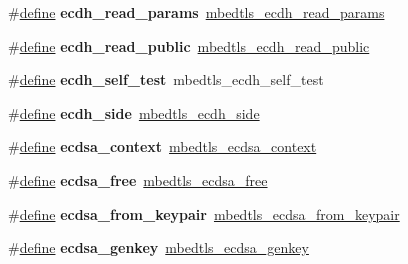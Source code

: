 \begin{DoxyCompactItemize}
\item 
\mbox{\label{compat-1_83_8h_a1052d06393481c61c19e62e19f0b2260}} 
\#\hyperlink{structdefine}{define} {\bfseries ecdh\+\_\+read\+\_\+params}~\hyperlink{ecdh_8h_af07326ad0017bf6fcfb9f93e43641254}{mbedtls\+\_\+ecdh\+\_\+read\+\_\+params}
\item 
\mbox{\label{compat-1_83_8h_a2f7e60281e99eb5f0377614c1acb1b1d}} 
\#\hyperlink{structdefine}{define} {\bfseries ecdh\+\_\+read\+\_\+public}~\hyperlink{ecdh_8h_a9f417d90797b109d3036feb288e33207}{mbedtls\+\_\+ecdh\+\_\+read\+\_\+public}
\item 
\mbox{\label{compat-1_83_8h_a1fd1aa9b4c0bc9cbf99bef8484624144}} 
\#\hyperlink{structdefine}{define} {\bfseries ecdh\+\_\+self\+\_\+test}~mbedtls\+\_\+ecdh\+\_\+self\+\_\+test
\item 
\mbox{\label{compat-1_83_8h_a86adb79cf567e9e5d6ad27336e598a31}} 
\#\hyperlink{structdefine}{define} {\bfseries ecdh\+\_\+side}~\hyperlink{ecdh_8h_ae5df12f2068df09a102e05e02fb1e39c}{mbedtls\+\_\+ecdh\+\_\+side}
\item 
\mbox{\label{compat-1_83_8h_a4e8a6b236724a3639613342f873da048}} 
\#\hyperlink{structdefine}{define} {\bfseries ecdsa\+\_\+context}~\hyperlink{ecdsa_8h_a86ad4c743272c83310c20585ec7a182f}{mbedtls\+\_\+ecdsa\+\_\+context}
\item 
\mbox{\label{compat-1_83_8h_a063d0a32d1dde6268c44d36c92819b36}} 
\#\hyperlink{structdefine}{define} {\bfseries ecdsa\+\_\+free}~\hyperlink{ecdsa_8h_a28dd93cb376a51cce39f062858c1c186}{mbedtls\+\_\+ecdsa\+\_\+free}
\item 
\mbox{\label{compat-1_83_8h_a0f0e05776d34f3190858eaf30cd06792}} 
\#\hyperlink{structdefine}{define} {\bfseries ecdsa\+\_\+from\+\_\+keypair}~\hyperlink{ecdsa_8h_a6de8efd872cfe1bc2ee93b4a5584226c}{mbedtls\+\_\+ecdsa\+\_\+from\+\_\+keypair}
\item 
\mbox{\label{compat-1_83_8h_ac5b5a9c03ad7266d7054cdf8e67da9c9}} 
\#\hyperlink{structdefine}{define} {\bfseries ecdsa\+\_\+genkey}~\hyperlink{ecdsa_8h_ab909bd06650e761e9fd176a86bd1ce17}{mbedtls\+\_\+ecdsa\+\_\+genkey}

\end{DoxyCompactItemize}

